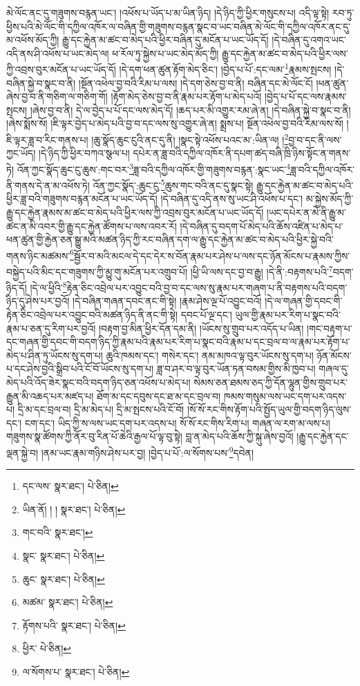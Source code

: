 མེ་ལོང་ནང་དུ་གཟུགས་བརྙན་ཡང་། །འཕོས་པ་ཡོད་པ་མ་ཡིན་ཉིད། །དེ་ཉིད་ཀྱི་ཕྱིར་གསུངས་པ། འདི་ལྟ་སྟེ། རབ་ཏུ་ཕྱིས་པའི་མེ་ལོང་གི་དཀྱིལ་འཁོར་ལ་བཞིན་གྱི་གཟུགས་བརྙན་སྣང་བ་ཡང་བཞིན་མེ་ལོང་གི་དཀྱིལ་འཁོར་ནང་དུ་མ་འཕོས་མོད་ཀྱི། རྒྱུ་དང་རྐྱེན་མ་ཚང་བ་མེད་པའི་ཕྱིར་བཞིན་དུ་མངོན་པ་ཡང་ཡོད་དོ། །དེ་བཞིན་དུ་འགའ་ཡང་འདི་ནས་ཤི་འཕོས་པ་ཡང་མེད་ལ། ཕ་རོལ་ཏུ་སྐྱེས་པ་ཡང་མེད་མོད་ཀྱི། རྒྱུ་དང་རྐྱེན་མ་ཚང་བ་མེད་པའི་ཕྱིར་ལས་ཀྱི་འབྲས་བུར་མངོན་པ་ཡང་ཡོད་དོ། །དེ་དག་ཕན་ཚུན་རྟོག་མེད་ཅིང་། །བྱེད་པ་པོ་:དང་ལམ་\footnote{དང་ལས་  སྣར་ཐང་།  པེ་ཅིན། }རྣམས་སྤངས། །དེ་བཞིན་སྐྱེ་བ་སྣང་བ་ནི། །སྔོན་འཕེལ་བྱ་བའི་རིམ་པ་ལས། །དེ་དག་ཅེས་བྱ་བ་ནི། བཞིན་དང་མེ་ལོང་ངོ། །ཕན་ཚུན་ཞེས་བྱ་བ་ནི་གཅིག་ལ་གཅིག་གོ། །རྟོག་མེད་ཅེས་བྱ་བ་ནི་རྣམ་པར་རྟོག་པ་མེད་པའོ། །བྱེད་པ་པོ་དང་ལས་རྣམས་སྤངས། །ཞེས་བྱ་བ་ནི། དེ་ལ་བྱེད་པ་པོ་དང་ལས་མེད་དོ། །ཆད་པར་མི་འགྱུར་རམ་ཞེ་ན། །དེ་བཞིན་སྐྱེ་བ་སྣང་བ་ནི། །ཞེས་སྨོས་སོ། །ཇི་ལྟར་བྱེད་པ་མེད་པའི་བྱ་བ་དང་ལས་སུ་འགྱུར་ཞེ་ན། སྨྲས་པ། སྔོན་འཕེལ་བྱ་བའི་རིམ་ལས་སོ། །ཇི་ལྟར་ཟླ་བ་རིང་གནས་པ། །ཆུ་སྣོད་ཆུང་ངུའི་ནང་དུ་ནི། །སྣང་སྟེ་འཕོས་པའང་མ་:ཡིན་ལ། །\footnote{ཡིན་ནོ། ། །  སྣར་ཐང་།  པེ་ཅིན། }བྱ་བ་དང་ནི་ལས་ཀྱང་ཡོད། །དེ་ཉིད་ཀྱི་ཕྱིར་བཀའ་སྩལ་པ། དཔེར་ན་ཟླ་བའི་དཀྱིལ་འཁོར་ནི་དཔག་ཚད་བཞི་ཁྲི་ཉིས་སྟོང་ན་གནས་ཏེ། འོན་ཀྱང་སྣོད་ཆུང་ངུ་ཆུས་:གང་བར་\footnote{གང་བའི་  སྣར་ཐང་། }ཟླ་བའི་དཀྱིལ་འཁོར་གྱི་གཟུགས་བརྙན་:སྣང་ཡང་\footnote{སྣང་  སྣར་ཐང་།  པེ་ཅིན། }ཟླ་བའི་དཀྱིལ་འཁོར་ནི་གནས་དེ་ན་མ་འཕོས་ཏེ། འོན་ཀྱང་སྣོད་:ཆུང་ངུ་\footnote{ཆུང་  སྣར་ཐང་།  པེ་ཅིན། }ཆུས་གང་བའི་ནང་དུ་སྣང་སྟེ། རྒྱུ་དང་རྐྱེན་མ་ཚང་བ་མེད་པའི་ཕྱིར་ཟླ་བའི་གཟུགས་བརྙན་མངོན་པ་ཡང་ཡོད་དོ། །དེ་བཞིན་དུ་འདི་ནས་སུ་ཡང་ཤི་འཕོས་པ་དང་། མ་སྐྱེས་མོད་ཀྱི་རྒྱུ་དང་རྐྱེན་རྣམས་མ་ཚང་བ་མེད་པའི་ཕྱིར་ལས་ཀྱི་འབྲས་བུར་མངོན་པ་ཡང་ཡོད་དོ། །ཡང་དཔེར་ན་མེ་ནི་རྒྱུ་མ་ཚང་ན་མི་འབར་གྱི་རྒྱུ་དང་རྐྱེན་ཚོགས་པ་ལས་འབར་རོ། །དེ་བཞིན་དུ་བདག་པོ་མེད་པའི་ཆོས་འཛིན་པ་མེད་པ་ཕན་ཚུན་གྱི་རྐྱེན་ཅན་སྒྱུ་མའི་མཚན་ཉིད་ཀྱི་རང་བཞིན་དག་ལ་རྒྱུ་དང་རྐྱེན་མ་ཚང་བ་མེད་པའི་ཕྱིར་སྐྱེ་བའི་གནས་ཉིང་མཚམས་\footnote{མཚམ་  སྣར་ཐང་།  པེ་ཅིན། }སྦྱོར་བ་མའི་མངལ་དེ་དང་དེར་ས་བོན་རྣམ་པར་ཤེས་པ་ལས་དང་ཉོན་མོངས་པ་རྣམས་ཀྱིས་བསྐྱེད་པའི་མིང་དང་གཟུགས་ཀྱི་མྱུ་གུ་མངོན་པར་འགྲུབ་པོ། །ཕྱི་ཡི་ལས་དང་བྱ་བ་རྒྱུ། །དེ་ནི་:བརྟགས་པའི་\footnote{རྟོགས་པའི་  སྣར་ཐང་།  པེ་ཅིན། }བདག་ཉིད་དོ། །དེ་ལ་ཕྱིའི་\footnote{ཕྱིར་  པེ་ཅིན། }རྟེན་ཅིང་འབྲེལ་པར་འབྱུང་བའི་བྱ་བ་དང་ལས་སུ་རྣམ་པར་གཞག་པ་ནི་བརྟགས་པའི་བདག་ཉིད་དུ་ཤེས་པར་བྱའོ། །དེ་བཞིན་གཞན་དབང་ནང་གི་སྟེ། །རྣམ་ཤེས་ལྔ་པོ་འབྱུང་བའོ། །དེ་ལ་གཞན་གྱི་དབང་གི་རྟེན་ཅིང་འབྲེལ་པར་འབྱུང་བའི་མཚན་ཉིད་ནི་ནང་གི་སྟེ། དབང་པོ་ལྔ་དང་། ཡུལ་གྱི་རྣམ་པར་རིག་པ་སྣང་བའི་རྣམ་པ་ཅན་དུ་རིག་པར་བྱའོ། །བརྟག་བྱ་མིན་ཕྱིར་དོན་དམ་ནི། །ཡོངས་སུ་གྲུབ་པར་འདོད་པ་ཡིན། །གང་བརྟག་པ་དང་གཞན་གྱི་དབང་གི་བདག་ཉིད་ཀྱི་རྣམ་པའི་རྣམ་པར་རིག་པ་སྣང་བའི་རྣམ་པ་དང་བྲལ་བ་ལ་རྣམ་པར་རྟོག་པ་མེད་པ་ཤིན་ཏུ་ཡོངས་སུ་དག་པ། ཆུའི་ཁམས་དང་། གསེར་དང་། ནམ་མཁའ་ལྟ་བུར་ཡོངས་སུ་དག་པ། ཉོན་མོངས་པ་དང་ཤེས་བྱའི་སྒྲིབ་པའི་ངོ་བོ་ཡོངས་སུ་དག་པ། ཟླ་བ་ཤར་བ་ལྟ་བུར་ཡོན་ཏན་བསམ་གྱིས་མི་ཁྱབ་པ། གཞལ་དུ་མེད་པའི་འོད་ཟེར་སྣང་བའི་བདག་ཉིད་ཅན་འཕོས་པ་མེད་པ། སེམས་ཅན་ཐམས་ཅད་ཀྱི་དོན་ལྷུན་གྱིས་གྲུབ་པར་རྒྱུན་མི་འཆད་པར་མཛད་པ། ཐོག་མ་དང་དབུས་དང་ཐ་མ་དང་བྲལ་བ། ཁམས་གསུམ་ལས་ཡང་དག་པར་འདས་པ། དྲི་མ་དང་བྲལ་བ། དྲི་མ་མེད་པ། དྲི་མ་སྤངས་པའི་ངོ་བོ། །སོ་སོ་རང་གིས་རྟོག་པའི་སྤྱོད་ཡུལ་གྱི་བདག་ཉིད་ལུས་དང་། ངག་དང་། ཡིད་ཀྱི་ས་ལས་ཡང་དག་པར་འདས་པ། སོ་སོ་རང་གིས་རིག་པ། གཞན་ལ་རག་མ་ལས་པ། གཟུགས་སྣ་ཚོགས་ཀྱི་ནོར་བུ་རིན་པོ་ཆེའི་རྒྱལ་པོ་ལྟ་བུ་སྟེ། བླ་ན་མེད་པའི་ཆོས་ཀྱི་སྐུ་ཞེས་བྱའོ། །རྒྱུ་དང་རྐྱེན་དང་ལྡན་སྐྱེ་བ། །ནམ་ཡང་རྣམ་གཉིས་ཤེས་པར་བྱ། །བྱེད་པ་པོ་:ལ་སོགས་པས་\footnote{ལ་སོགས་པ་  སྣར་ཐང་།  པེ་ཅིན། }དབེན། 